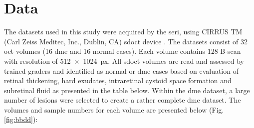 \graphicspath{ {./content/method/figures/} }


\section{Data}\label{sec:data}

The datasets used in this study were acquired by the \gls{seri}, using CIRRUS TM (Carl Zeiss Meditec, Inc., Dublin, CA) \gls{sdoct} device \cite{Chen2005}.
The datasets consist of 32 \gls{oct} volumes (16 \gls{dme} and 16 normal cases).
Each volume contains 128 B-scan with resolution of 512~$\times$~1024~\si{px}.
All \gls{sdoct} volumes are read and assessed by trained graders and identified as normal or \gls{dme} cases based on evaluation of retinal thickening, hard exudates, intraretinal cystoid space formation and subretinal fluid as presented in the table below.
Within the \gls{dme} dataset, a large number of lesions were selected to create a rather complete \gls{dme} dataset.
The volumes and sample numbers for each volume are presented below (Fig.\,\ref{fig:bbdd}):



